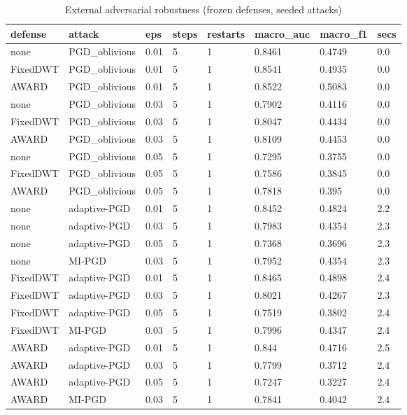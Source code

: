 \begin{table}[htbp]\centering\small
\caption{External adversarial robustness (frozen defenses, seeded attacks)}\label{tab:extrob}
\begin{tabular}{llllllll}
\hline
defense & attack & eps & steps & restarts & macro_auc & macro_f1 & secs \\
\hline
none & PGD_oblivious & 0.01 & 5 & 1 & 0.8461 & 0.4749 & 0.0 \\
FixedDWT & PGD_oblivious & 0.01 & 5 & 1 & 0.8541 & 0.4935 & 0.0 \\
AWARD & PGD_oblivious & 0.01 & 5 & 1 & 0.8522 & 0.5083 & 0.0 \\
none & PGD_oblivious & 0.03 & 5 & 1 & 0.7902 & 0.4116 & 0.0 \\
FixedDWT & PGD_oblivious & 0.03 & 5 & 1 & 0.8047 & 0.4434 & 0.0 \\
AWARD & PGD_oblivious & 0.03 & 5 & 1 & 0.8109 & 0.4453 & 0.0 \\
none & PGD_oblivious & 0.05 & 5 & 1 & 0.7295 & 0.3755 & 0.0 \\
FixedDWT & PGD_oblivious & 0.05 & 5 & 1 & 0.7586 & 0.3845 & 0.0 \\
AWARD & PGD_oblivious & 0.05 & 5 & 1 & 0.7818 & 0.395 & 0.0 \\
none & adaptive-PGD & 0.01 & 5 & 1 & 0.8452 & 0.4824 & 2.2 \\
none & adaptive-PGD & 0.03 & 5 & 1 & 0.7983 & 0.4354 & 2.3 \\
none & adaptive-PGD & 0.05 & 5 & 1 & 0.7368 & 0.3696 & 2.3 \\
none & MI-PGD & 0.03 & 5 & 1 & 0.7952 & 0.4354 & 2.3 \\
FixedDWT & adaptive-PGD & 0.01 & 5 & 1 & 0.8465 & 0.4898 & 2.4 \\
FixedDWT & adaptive-PGD & 0.03 & 5 & 1 & 0.8021 & 0.4267 & 2.3 \\
FixedDWT & adaptive-PGD & 0.05 & 5 & 1 & 0.7519 & 0.3802 & 2.4 \\
FixedDWT & MI-PGD & 0.03 & 5 & 1 & 0.7996 & 0.4347 & 2.4 \\
AWARD & adaptive-PGD & 0.01 & 5 & 1 & 0.844 & 0.4716 & 2.5 \\
AWARD & adaptive-PGD & 0.03 & 5 & 1 & 0.7799 & 0.3712 & 2.4 \\
AWARD & adaptive-PGD & 0.05 & 5 & 1 & 0.7247 & 0.3227 & 2.4 \\
AWARD & MI-PGD & 0.03 & 5 & 1 & 0.7841 & 0.4042 & 2.4 \\
\hline
\end{tabular}
\end{table}

